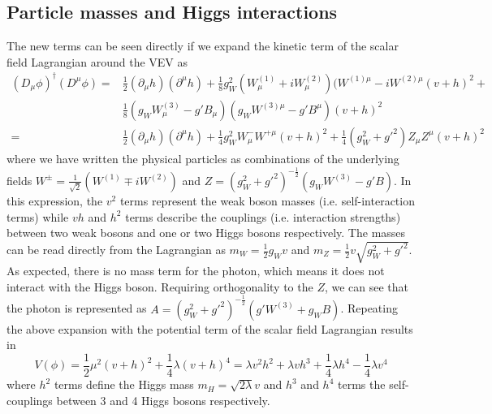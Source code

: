 \subsection{Particle masses and Higgs interactions}

The new terms can be seen directly if we expand the kinetic term of the scalar field Lagrangian around the VEV 
as
\begin{equation}
\begin{aligned}
(D_{\mu}\phi)^{\dagger}(D^{\mu}\phi) =& \frac{1}{2}(\partial_{\mu}h)(\partial^{\mu}h) + 
\frac{1}{8}g_W^2(W_{\mu}^{(1)} + iW_{\mu}^{(2)})(W^{(1)\mu} - iW^{(2)\mu}(v+h)^2 + \\
&\frac{1}{8}(g_WW_{\mu}^{(3)} - g'B_{\mu})(g_WW^{(3)\mu} - g'B^{\mu})(v+h)^2 \\
=&\frac{1}{2}(\partial_{\mu}h)(\partial^{\mu}h) + \frac{1}{4}g_W^2W_{\mu}^-W^{+\mu}(v+h)^2 + 
\frac{1}{4}(g_W^2+g'^2)Z_{\mu}Z^{\mu}(v+h)^2
\end{aligned}
\end{equation}
where we have written the physical particles as combinations of the underlying fields 
$W^{\pm} = \frac{1}{\sqrt{2}}(W^{(1)} \mp iW^{(2)})$ and 
$Z = (g^2_W + g'^2)^{-\frac{1}{2}}(g_WW^{(3)} - g'B)$. In this expression,  the $v^2$ terms represent 
the weak boson masses (i.e. self-interaction terms) while $vh$ and $h^2$ terms describe the couplings 
(i.e. interaction strengths) between two weak bosons and one or two Higgs bosons respectively. The masses 
can be read directly from the Lagrangian as $m_W = \frac{1}{2}g_Wv$ and 
$m_Z = \frac{1}{2}v\sqrt{g^2_W + g'^2}$. As expected, there is no mass term for the photon, which means 
it does not interact with the Higgs boson. Requiring orthogonality to the $Z$, we can see that the photon is 
represented as $A = (g^2_W + g'^2)^{-\frac{1}{2}}(g'W^{(3)} + g_WB)$. Repeating the above expansion 
with the potential term of the scalar field Lagrangian results in 
\begin{equation}
V(\phi) = \frac{1}{2}\mu^2(v+h)^2 + \frac{1}{4}\lambda(v+h)^4 = 
\lambda v^2h^2 + \lambda vh^3 + \frac{1}{4}\lambda h^4 - \frac{1}{4}\lambda v^4
\end{equation}
where $h^2$ terms define the Higgs mass $m_H = \sqrt{2\lambda}v$ and $h^3$ and $h^4$ terms the 
self-couplings between 3 and 4 Higgs bosons respectively. \par

